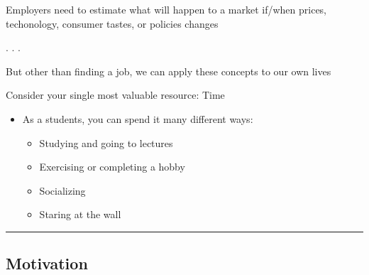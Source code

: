 \documentclass[
  letterpaper,
  DIV=11,
  numbers=noendperiod]{scrartcl}
\providecommand{\tightlist}{%
  \setlength{\itemsep}{0pt}\setlength{\parskip}{0pt}}\usepackage{longtable,booktabs,array}
\begin{document}
Employers need to estimate what will happen to a market if/when prices,
techonology, consumer tastes, or policies changes

. . .

{But other than finding a job, we can apply these concepts to our own
lives}

Consider your single most valuable resource: {Time}

\begin{itemize}
\item
  As a students, you can spend it many different ways:

  \begin{itemize}
  \tightlist
  \item
    Studying and going to lectures
  \item
    Exercising or completing a hobby
  \item
    Socializing
  \item
    Staring at the wall
  \end{itemize}
\end{itemize}

\begin{center}\rule{0.5\linewidth}{0.5pt}\end{center}

\hypertarget{motivation-4}{%
\subsection{Motivation}\label{motivation-4}}
\end{document}
